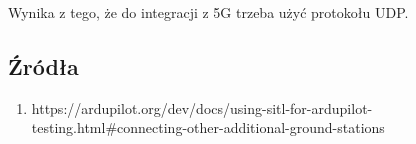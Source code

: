 \documentclass{article}
\begin{document}
\begin{center}
    Wynika z tego, że do integracji z 5G trzeba użyć protokołu UDP.
\end{center}

\subsection{Źródła}
\begin{enumerate}
    \item https://ardupilot.org/dev/docs/using-sitl-for-ardupilot-testing.html#connecting-other-additional-ground-stations
\end{enumerate}
\end{document}

